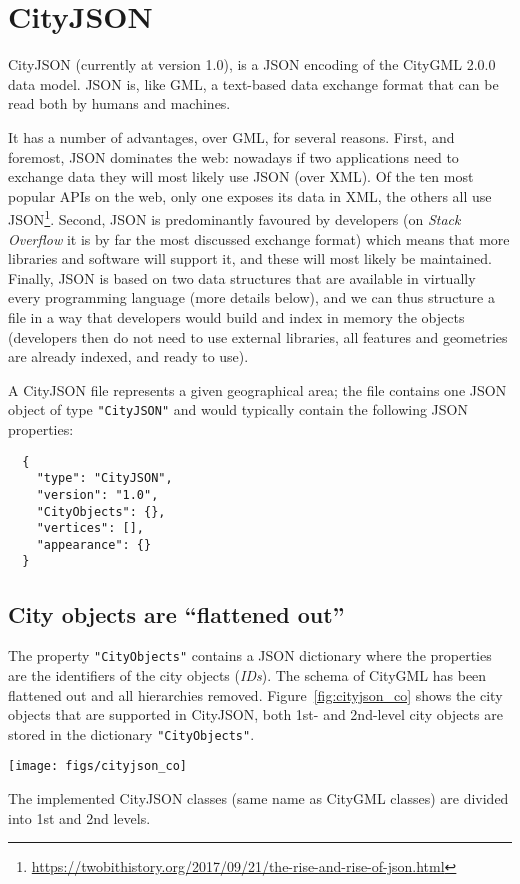\section{CityJSON}%

CityJSON (currently at version 1.0), is a JSON encoding of the CityGML 2.0.0 data model.
JSON is, like GML, a text-based data exchange format that can be read both by humans and machines.

It has a number of advantages, over GML, for several reasons.
First, and foremost, JSON dominates the web: nowadays if two applications need to exchange data they will most likely use JSON (over XML).
Of the ten most popular APIs on the web, only one exposes its data in XML, the others all use JSON\footnote{\url{https://twobithistory.org/2017/09/21/the-rise-and-rise-of-json.html}}.
Second, JSON is predominantly favoured by developers (on \emph{Stack Overflow} it is by far the most discussed exchange format) which means that more libraries and software will support it, and these will most likely be maintained.
Finally, JSON is based on two data structures that are available in virtually every programming language (more details below), and we can thus structure a file in a way that  developers would build and index in memory the objects (developers then do not need to use external libraries, all features and geometries are already indexed, and ready to use). 

%

A CityJSON file represents a given geographical area; the file contains one JSON object of type \texttt{"CityJSON"} and would typically contain the following JSON properties:
\begin{lstlisting}
  {
    "type": "CityJSON",
    "version": "1.0",
    "CityObjects": {},
    "vertices": [],
    "appearance": {}
  }
\end{lstlisting}


\subsection{City objects are ``flattened out''}

The property \texttt{"CityObjects"} contains a JSON dictionary where the properties are the identifiers of the city objects (\emph{IDs}).
The schema of CityGML has been flattened out and all hierarchies removed.
Figure~\ref{fig:cityjson_co} shows the city objects that are supported in CityJSON, both 1st- and 2nd-level city objects are stored in the dictionary \texttt{"CityObjects"}.
\begin{marginfigure}
  \centering
  \texttt{[image: figs/cityjson\_co]}
  \caption{The implemented CityJSON classes (same name as CityGML classes) are divided into 1st and 2nd levels.}%
\label{fig:cityjson_co}
\end{marginfigure}

